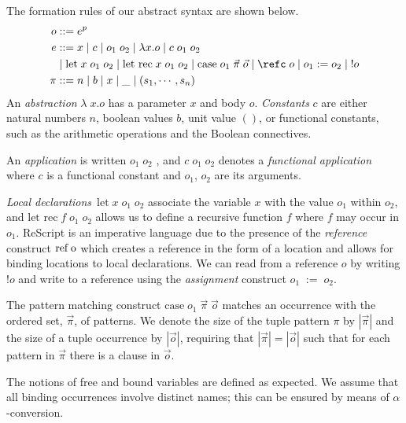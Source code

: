 \documentclass{eptcs}
\begin{document}
The formation rules of our abstract syntax are shown below.
%
\begin{align*}
o &::= e^p \\
e &::= x \mid c \mid o_1\;o_2 \mid \lambda x.o \mid c \; o_1 \; o_2\\
			& \mid \mbox{let} \; x \; o_1 \; o_2 \mid
                   \mbox{let rec} \; x \; o_1 \; o_2 \mid \mbox{case}
                   \; o_1 \; \vec{\pi} \; \vec{o} \mid  \refc \; o \mid o_1 := o_2 \mid \; !o\\
\pi &::= n \mid b \mid x \mid \_  \mid
                                (s_1,\cdots,s_n)
\end{align*}
%
An \emph{abstraction} $\lambda\;x.o$ has a parameter $x$ and
body $o$.  \emph{Constants} $c$ are either natural numbers $n$,
boolean values $b$, unit value $()$, or functional constants, such as
the arithmetic operations and the Boolean connectives.

An \emph{application} is written $o_1\;o_2$ , and $c\;o_1\;o_2$ denotes a
\emph{functional application} where $c$ is a functional constant and
$o_1$, $o_2$ are its arguments.

\emph{Local declarations} $\mbox{let} \; x \; o_1 \; o_2$ associate
the variable $x$ with the value $o_1$ within $o_2$, and
$\mbox{let rec} \; f \; o_1 \; o_2$ allows us to define a recursive
function $f$ where $f$ may occur in $o_1$. ReScript is an imperative
language due to the presence of the \emph{reference} construct
$\mbox{ref\;o}$ which creates a reference in the form of a location
and allows for binding locations to local declarations. We can read
from a reference $o$ by writing $!o$ and write to a reference using
the \emph{assignment} construct $o_1\;:=\;o_2$.

The pattern matching construct
$\mbox{case} \; o_1 \; \vec{\pi} \; \vec{o}$ matches an occurrence
with the ordered set, $\vec{\pi}$, of patterns.  We denote the size of
the tuple pattern $\pi$ by $|\vec{\pi}|$ and the size of a tuple
occurrence by $|\vec{o}|$, requiring that $|\vec{\pi}| = |\vec{o}|$
such that for each pattern in $\vec{\pi}$ there is a clause in
$\vec{o}$.

The notions of free and bound variables are defined as expected. We
assume that all binding occurrences involve distinct names; this can
be ensured by means of $\alpha$-conversion.
\end{document}
